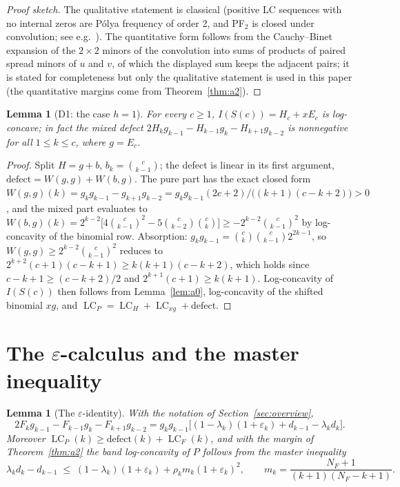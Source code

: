 \documentclass[11pt]{article}
\newtheorem{lemma}[theorem]{Lemma}
\theoremstyle{definition}
\newcommand{\eps}{\varepsilon}
\DeclareMathOperator{\lc}{LC}
\begin{document}
\begin{proof}[Proof sketch]
The qualitative statement is classical (positive LC sequences with no
internal zeros are P\'olya frequency of order 2, and PF$_2$ is closed
under convolution; see e.g.~\cite{Karlin}).  The quantitative form
follows from the Cauchy--Binet expansion of the $2\times2$ minors of
the convolution into sums of products of paired spread minors of $u$
and $v$, of which the displayed sum keeps the adjacent pairs; it is
stated for completeness but only the qualitative statement is used in
this paper (the quantitative margins come from Theorem~\ref{thm:a2}).
\end{proof}

\begin{lemma}[D1: the case $h=1$]\label{lem:d1}
For every $c\ge1$, $I(S(c))=H_c+xE_c$ is log-concave; in fact the
mixed defect $2H_kg_{k-1}-H_{k-1}g_k-H_{k+1}g_{k-2}$ is nonnegative
for all $1\le k\le c$, where $g=E_c$.
\end{lemma}

\begin{proof}
Split $H=g+b$, $b_k=\binom c{k-1}$; the defect is linear in its first
argument, $\mathrm{defect}=W(g,g)+W(b,g)$.  The pure part has the
exact closed form
$W(g,g)(k)=g_kg_{k-1}-g_{k+1}g_{k-2}
=g_kg_{k-1}(2c+2)/\bigl((k+1)(c-k+2)\bigr)>0$, and the mixed part
evaluates to
$W(b,g)(k)=2^{k-2}\bigl[4\binom c{k-1}^2-5\binom c{k-2}\binom ck\bigr]
\ge-2^{k-2}\binom c{k-1}^2$ by log-concavity of the binomial row.
Absorption: $g_kg_{k-1}=\binom ck\binom c{k-1}2^{2k-1}$, so
$W(g,g)\ge2^{k-2}\binom c{k-1}^2$ reduces to
$2^{k+2}(c+1)(c-k+1)\ge k(k+1)(c-k+2)$, which holds since
$c-k+1\ge(c-k+2)/2$ and $2^{k+1}(c+1)\ge k(k+1)$.  Log-concavity of
$I(S(c))$ then follows from Lemma~\ref{lem:a0}, log-concavity of the
shifted binomial $xg$, and $\lc_P=\lc_H+\lc_{xg}+\mathrm{defect}$.
\end{proof}

\section{The \texorpdfstring{$\eps$}{eps}-calculus and the master
inequality}\label{sec:eps}

\begin{lemma}[The $\eps$-identity]\label{lem:epsid}
With the notation of Section~\ref{sec:overview},
\[
  2F_kg_{k-1}-F_{k-1}g_k-F_{k+1}g_{k-2}
  = g_kg_{k-1}\bigl[(1-\lambda_k)(1+\eps_k)+d_{k-1}-\lambda_kd_k\bigr].
\]
Moreover $\lc_P(k)\ge \mathrm{defect}(k)+\lc_F(k)$, and with the margin
of Theorem~\ref{thm:a2} the band log-concavity of $P$ follows from the
\emph{master inequality}
\begin{equation}\label{eq:master}
  \lambda_kd_k-d_{k-1}\;\le\;(1-\lambda_k)(1+\eps_k)
  +\rho_k m_k(1+\eps_k)^2,
  \qquad m_k=\frac{N_F+1}{(k+1)(N_F-k+1)} .
\end{equation}
\end{lemma}
\end{document}
